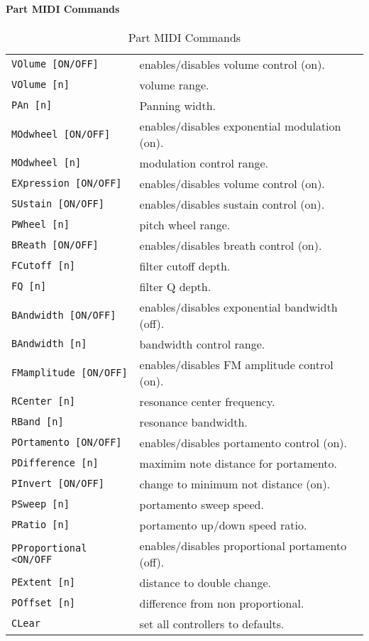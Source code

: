 \paragraph{Part MIDI Commands}
\label{paragraph:command_line_part_midi_commands}
   \begin{table}[H]
      \centering
      \caption{Part MIDI Commands}
      \label{table:yoshimi_part_midi_commands}
      \begin{tabular}{l l}
\texttt{VOlume [ON/OFF]} &
   enables/disables volume control (on). \\
\texttt{VOlume [n]} &
   volume range. \\
\texttt{PAn [n]} &
   Panning width. \\
\texttt{MOdwheel [ON/OFF]} &
   enables/disables exponential modulation (on). \\
\texttt{MOdwheel [n]} &
   modulation control range. \\
\texttt{EXpression [ON/OFF]} &
   enables/disables volume control (on). \\
\texttt{SUstain [ON/OFF]} &
   enables/disables sustain control (on). \\
\texttt{PWheel [n]} &
   pitch wheel range. \\
\texttt{BReath [ON/OFF]} &
   enables/disables breath control (on). \\
\texttt{FCutoff [n]} &
   filter cutoff depth. \\
\texttt{FQ [n]} &
   filter Q depth. \\
\texttt{BAndwidth [ON/OFF]} &
   enables/disables exponential bandwidth (off). \\
\texttt{BAndwidth [n]} &
   bandwidth control range. \\
\texttt{FMamplitude [ON/OFF]} &
   enables/disables FM amplitude control (on). \\
\texttt{RCenter [n]} &
   resonance center frequency. \\
\texttt{RBand [n]} &
   resonance bandwidth. \\
\texttt{POrtamento [ON/OFF]} &
   enables/disables portamento control (on). \\
\texttt{PDifference [n]} &
   maximim note distance for portamento. \\
\texttt{PInvert [ON/OFF]} &
   change to minimum not distance (on). \\
\texttt{PSweep [n]} &
   portamento sweep speed. \\
\texttt{PRatio [n]} &
   portamento up/down speed ratio. \\
\texttt{PProportional <ON/OFF} &
   enables/disables proportional portamento (off). \\
\texttt{PExtent [n]} &
   distance to double change. \\
\texttt{POffset [n]} &
   difference from non proportional. \\
\texttt{CLear} &
   set all controllers to defaults. \\
      \end{tabular}
   \end{table}

